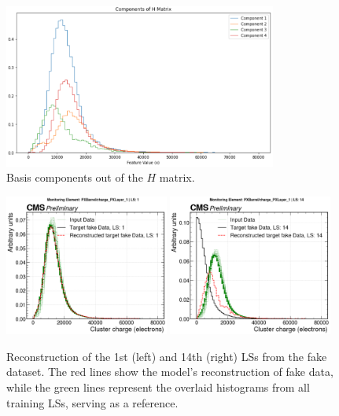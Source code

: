 \begin{figure}[H]
    \centering
    \includegraphics[width=0.8\textwidth]{images/Hcomponents.png}
    \caption{Basis components out of the \( H \) matrix.}
    \label{fig:components}
\end{figure}

\begin{figure}[H]
    \centering
    \includegraphics[width=0.48\textwidth]{images/fake_reco_ls1.png}
    \hfill
    \includegraphics[width=0.48\textwidth]{images/fake_reco_ls14.png}
    \caption{Reconstruction of the 1st (left) and 14th (right) LSs from the fake dataset. The red lines show the model’s reconstruction of fake data, while the green lines represent the overlaid histograms from all training LSs, serving as a reference.}
    \label{fig:reconstruction}
\end{figure}

